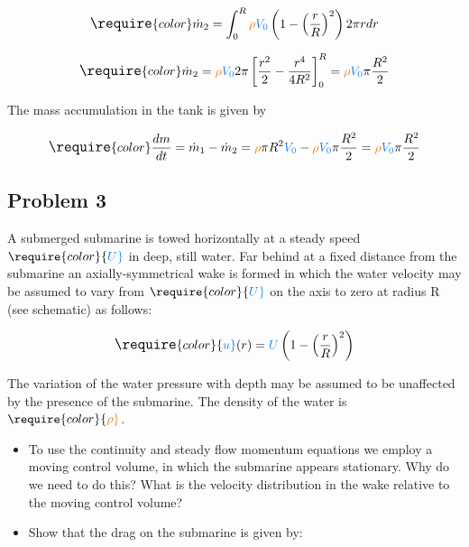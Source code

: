 \documentclass[
  1.2em,
  letterpaper,
  DIV=11,
  numbers=noendperiod]{scrartcl}
\begin{document}
\[
\large
\require{color}\dot{m}_2 = \int_{0}^{R} {\color[rgb]{0.918231,0.469102,0.038229}\rho} {\color[rgb]{0.059472,0.501943,0.998465}V_0 } \left( 1- \left( \frac{r}{R} \right)^2 \right) 2 \pi r dr
\]

\[
\large
\require{color}\dot{m}_2 =  {\color[rgb]{0.918231,0.469102,0.038229}\rho} {\color[rgb]{0.059472,0.501943,0.998465}V_0 } 2 \pi \left[ \frac{r^2}{2} - \frac{r^4}{4R^2} \right]^{R}_{0} = {\color[rgb]{0.918231,0.469102,0.038229}\rho} {\color[rgb]{0.059472,0.501943,0.998465}V_0 } \pi \frac{R^2}{2}
\]

The mass accumulation in the tank is given by

\[
\large 
\require{color}\frac{dm}{dt} = \dot{m}_1 - \dot{m}_2  = {\color[rgb]{0.918231,0.469102,0.038229}\rho} \pi R^2 {\color[rgb]{0.059472,0.501943,0.998465}V_0 } - {\color[rgb]{0.918231,0.469102,0.038229}\rho} {\color[rgb]{0.059472,0.501943,0.998465}V_0 } \pi \frac{R^2}{2} = {\color[rgb]{0.918231,0.469102,0.038229}\rho} {\color[rgb]{0.059472,0.501943,0.998465}V_0 } \pi \frac{R^2}{2}
\]

\hypertarget{problem-3}{%
\subsection{Problem 3}\label{problem-3}}

A submerged submarine is towed horizontally at a steady speed
\(\require{color}{\color[rgb]{0.059472,0.501943,0.998465}U}\) in deep,
still water. Far behind at a fixed distance from the submarine an
axially-symmetrical wake is formed in which the water velocity may be
assumed to vary from
\(\require{color}{\color[rgb]{0.059472,0.501943,0.998465}U}\) on the
axis to zero at radius R (see schematic) as follows:

\[
\large
\require{color}{\color[rgb]{0.059472,0.501943,0.998465}u}(r)={\color[rgb]{0.059472,0.501943,0.998465}U } \left( 1- \left( \frac{r}{R} \right)^2 \right)
\]

The variation of the water pressure with depth may be assumed to be
unaffected by the presence of the submarine. The density of the water is
\(\require{color}{\color[rgb]{0.918231,0.469102,0.038229}\rho}\).

\begin{itemize}
\item
  To use the continuity and steady flow momentum equations we employ a
  moving control volume, in which the submarine appears stationary. Why
  do we need to do this? What is the velocity distribution in the wake
  relative to the moving control volume?
\item
  Show that the drag on the submarine is given by:
\end{itemize}
\end{document}
